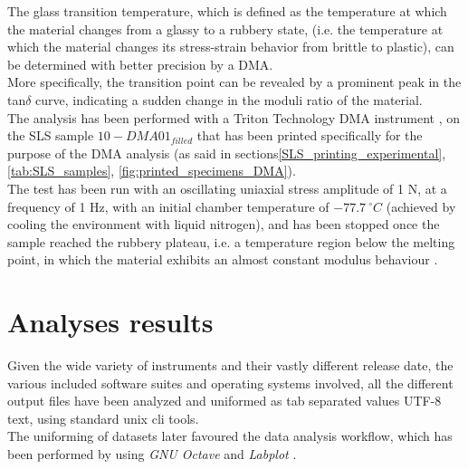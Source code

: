 \documentclass{article}
\begin{document}
        The glass transition temperature, which is defined as the temperature at which the material changes from a glassy to a rubbery state, 
        (i.e. the temperature at which the material changes its stress-strain behavior from brittle to plastic), can be determined with 
        better precision by a DMA. \\ 

        More specifically, the transition point can be revealed by a prominent peak in the tan$\delta$ curve, indicating a 
        sudden change in the moduli ratio of the material. \\ 
        
        The analysis has been performed with a Triton Technology DMA instrument \autocites{Triton_Technology_Ltd}, on the SLS sample 
        $10-DMA01_{filled}$ that has been printed specifically for the purpose of the DMA analysis 
        (as said in sections\ref{SLS_printing_experimental}, \ref{tab:SLS_samples}, \ref{fig:printed_specimens_DMA}). \\ 

        The test has been run with an oscillating uniaxial stress amplitude of 1 N, at a frequency of 1 Hz, with an initial 
        chamber temperature of $- 77.7 \ ^{\circ}C$ (achieved by cooling the environment with liquid nitrogen), and has been stopped 
        once the sample reached the rubbery plateau, i.e. a temperature region below the melting point, in which the material 
        exhibits an almost constant modulus behaviour \autocites{JD_Ferry_viscoelasticpolymers}. \\


      \section{Analyses results\label{analyses_results_general}}

      Given the wide variety of instruments and their vastly different release date, the various included software suites and operating systems involved,
      all the different output files have been analyzed and uniformed as tab separated values UTF-8 text, using standard unix cli tools. \\ 
      
      The uniforming of datasets later favoured the data analysis workflow, which has been performed by using \textit{GNU Octave} \autocites{Octave} and \textit{Labplot} \autocites{Labplot}. \\
\end{document}
